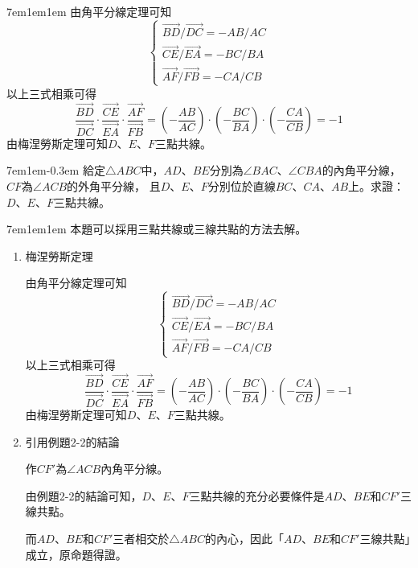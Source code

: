 \documentclass[12pt]{article}
\begin{document}
\begin{mybox}[Answer 3]{7em}{1em}{1em}
    由角平分線定理可知
    $$
        \begin{cases}
            \overrightarrow{BD}/\overrightarrow{DC}=-AB/AC\\
            \overrightarrow{CE}/\overrightarrow{EA}=-BC/BA\\
            \overrightarrow{AF}/\overrightarrow{FB}=-CA/CB
        \end{cases}
    $$
    以上三式相乘可得
    $$
        \frac{\overrightarrow{BD}}{\overrightarrow{DC}}
        \cdot\frac{\overrightarrow{CE}}{\overrightarrow{EA}}
        \cdot\frac{\overrightarrow{AF}}{\overrightarrow{FB}} = 
        \left(-\frac{AB}{AC}\right)
        \cdot\left(-\frac{BC}{BA}\right)
        \cdot\left(-\frac{CA}{CB}\right)=-1
    $$
    由梅涅勞斯定理可知$D$、$E$、$F$三點共線。
\end{mybox}
\begin{mybox}[Problem 4]{7em}{1em}{-0.3em}
   給定$\triangle{ABC}$中，$AD$、$BE$分別為$\angle{BAC}$、$\angle{CBA}$的內角平分線，$CF$為$\angle{ACB}$的外角平分線，
   且$D$、$E$、$F$分別位於直線$BC$、$CA$、$AB$上。求證：$D$、$E$、$F$三點共線。
\end{mybox}
\begin{mybox}[Answer 4]{7em}{1em}{1em}
    本題可以採用三點共線或三線共點的方法去解。
    \begin{enumerate}[label = 方法 \arabic*：]
        \item 梅涅勞斯定理
        
        由角平分線定理可知
        $$
            \begin{cases}
                \overrightarrow{BD}/\overrightarrow{DC}=-AB/AC\\
                \overrightarrow{CE}/\overrightarrow{EA}=-BC/BA\\
                \overrightarrow{AF}/\overrightarrow{FB}=-CA/CB
            \end{cases}
        $$
        以上三式相乘可得
        $$
            \frac{\overrightarrow{BD}}{\overrightarrow{DC}}
            \cdot\frac{\overrightarrow{CE}}{\overrightarrow{EA}}
            \cdot\frac{\overrightarrow{AF}}{\overrightarrow{FB}} = 
            \left(-\frac{AB}{AC}\right)
            \cdot\left(-\frac{BC}{BA}\right)
            \cdot\left(-\frac{CA}{CB}\right)=-1
        $$
        由梅涅勞斯定理可知$D$、$E$、$F$三點共線。
        \item 引用例題2-2的結論
        
        作$CF'$為$\angle{ACB}$內角平分線。
        
        由例題2-2的結論可知，$D$、$E$、$F$三點共線的充分必要條件是$AD$、$BE$和$CF'$三線共點。

        而$AD$、$BE$和$CF'$三者相交於$\triangle{ABC}$的內心，因此「$AD$、$BE$和$CF'$三線共點」成立，原命題得證。
    \end{enumerate}
    
\end{mybox}
\end{document}
